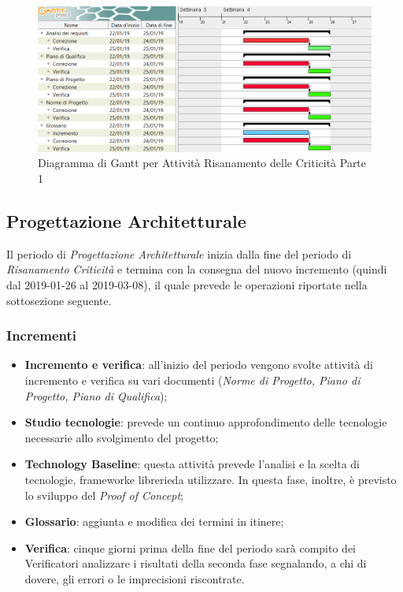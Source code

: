 \begin{figure}[h]
	\centering
  		\includegraphics[width=1.0\linewidth]{./images/RisanamentoCriticita1.png}
  		\caption{Diagramma di Gantt per Attività Risanamento delle Criticità Parte 1}
  		\label{fig:Gantt Risananmento Criticità 1}
\end{figure}

\newpage
\subsection{Progettazione Architetturale}

Il periodo di \textit{Progettazione Architetturale} inizia dalla fine del periodo di \textit{Risanamento Criticità} e termina con la consegna del nuovo incremento (quindi dal 2019-01-26 al 2019-03-08), il quale prevede le operazioni riportate nella sottosezione seguente.

\subsubsection{Incrementi}
\begin{itemize}
	\item \textbf{Incremento e verifica}: all'inizio del periodo vengono svolte attività di incremento e verifica su vari documenti (\textit{Norme di Progetto, Piano di Progetto, Piano di Qualifica});
	\item \textbf{Studio tecnologie}: prevede un continuo approfondimento delle tecnologie necessarie allo svolgimento del progetto; 
	\item \textbf{Technology Baseline}\glossario: questa attività prevede l'analisi e la scelta di tecnologie, framework\glossario e librerie\glossario da utilizzare. In questa fase, inoltre, è previsto lo sviluppo del \textit{Proof of Concept}\glossario;
	\item \textbf{Glossario}: aggiunta e modifica dei termini in itinere;  
	\item \textbf{Verifica}: cinque giorni prima della fine del periodo sarà compito dei Verificatori analizzare i risultati della seconda fase segnalando, a chi di dovere, gli errori o le imprecisioni riscontrate.
\end{itemize}


